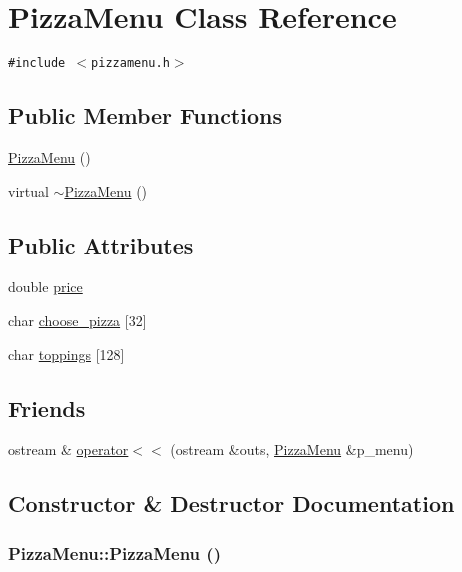 \hypertarget{class_pizza_menu}{
\section{Pizza\-Menu Class Reference}
\label{class_pizza_menu}
}
{\tt \#include $<$pizzamenu.h$>$}

\subsection*{Public Member Functions}
\begin{CompactItemize}
\item 
\hyperlink{class_pizza_menu_d5e4439012b1cdd2b59fb8568a17ba51}{Pizza\-Menu} ()
\item 
virtual \hyperlink{class_pizza_menu_e29c121e0c9e4357894f64d04b8a4ea6}{$\sim$Pizza\-Menu} ()
\end{CompactItemize}
\subsection*{Public Attributes}
\begin{CompactItemize}
\item 
double \hyperlink{class_pizza_menu_78a5eb43deef9a7b5b9ce157b9d52ac4}{price}
\item 
char \hyperlink{class_pizza_menu_04a00e7cbd548718d71a7c6afccae12f}{choose\_\-pizza} \mbox{[}32\mbox{]}
\item 
char \hyperlink{class_pizza_menu_b4f1e053cb69bc112e31a52a18d64dbd}{toppings} \mbox{[}128\mbox{]}
\end{CompactItemize}
\subsection*{Friends}
\begin{CompactItemize}
\item 
ostream \& \hyperlink{class_pizza_menu_09ec739bea659a73825966761529e5d7}{operator$<$$<$} (ostream \&outs, \hyperlink{class_pizza_menu}{Pizza\-Menu} \&p\_\-menu)
\end{CompactItemize}


\subsection{Constructor \& Destructor Documentation}
\hypertarget{class_pizza_menu_d5e4439012b1cdd2b59fb8568a17ba51}{
\subsubsection[PizzaMenu]{\setlength{\rightskip}{0pt plus 5cm}Pizza\-Menu::Pizza\-Menu ()}}
\label{class_pizza_menu_d5e4439012b1cdd2b59fb8568a17ba51}


